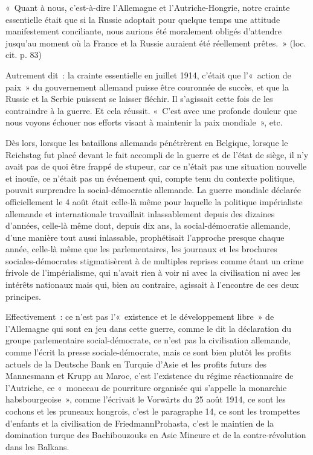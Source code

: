 \documentclass[french,twoside]{book} %
\newenvironment{quoteblock}%
  {\begin{quoting}}
  {\end{quoting}}
\newenvironment{quotebar}{%
    \def\FrameCommand{{\color{rubric!10!}\vrule width 0.5em} \hspace{0.9em}}%
    \def\OuterFrameSep{\itemsep} %
    \MakeFramed {\advance\hsize-\width \FrameRestore}
  }%
  {%
    \endMakeFramed
  }
\renewenvironment{quoteblock}%
  {%
    \savenotes
    \setstretch{0.9}
    \normalfont
    \begin{quotebar}
  }
  {%
    \end{quotebar}
    \spewnotes
  }
\begin{document}
\begin{quoteblock}
 \noindent « Quant à nous, c’est-à-dire l’Allemagne et l’Autriche-Hongrie, notre crainte essentielle était que si la Russie adoptait pour quelque temps une attitude manifestement conciliante, nous aurions été moralement obligés d’attendre jusqu’au moment où la France et la Russie auraient été réellement prêtes. » (loc. cit. p. 83)
\end{quoteblock}

\noindent Autrement dit : la crainte essentielle en juillet 1914, c’était que l’« action de paix » du gouvernement allemand puisse être couronnée de succès, et que la Russie et la Serbie puissent se laisser fléchir. Il s’agissait cette fois de les contraindre à la guerre. Et cela réussit. « C'est avec une profonde douleur que nous voyons échouer nos efforts visant à maintenir la paix mondiale », etc.\par
Dès lors, lorsque les bataillons allemands pénétrèrent en Belgique, lorsque le Reichstag fut placé devant le fait accompli de la guerre et de l’état de siège, il n’y avait pas de quoi être frappé de stupeur, car ce n’était pas une situation nouvelle et inouïe, ce n’était pas un événement qui, compte tenu du contexte politique, pouvait surprendre la social-démocratie allemande. La guerre mondiale déclarée officiellement le 4 août était celle-là même pour laquelle la politique impérialiste allemande et internationale travaillait inlassablement depuis des dizaines d’années, celle-là même dont, depuis dix ans, la social-démocratie allemande, d’une manière tout aussi inlassable, prophétisait l’approche presque chaque année, celle-là même que les parlementaires, les journaux et les brochures sociales-démocrates stigmatisèrent à de multiples reprises comme étant un crime frivole de l’impérialisme, qui n’avait rien à voir ni avec la civilisation ni avec les intérêts nationaux mais qui, bien au contraire, agissait à l’encontre de ces deux principes.\par
Effectivement : ce n’est pas l’« existence et le développement libre » de l’Allemagne qui sont en jeu dans cette guerre, comme le dit la déclaration du groupe parlementaire social-démocrate, ce n’est pas la civilisation allemande, comme l’écrit la presse sociale-démocrate, mais ce sont bien plutôt les profits actuels de la Deutsche Bank en Turquie d’Asie et les profits futurs des Mannesmann et Krupp au Maroc, c’est l’existence du régime réactionnaire de l’Autriche, ce « monceau de pourriture organisée qui s’appelle la monarchie habsbourgeoise », comme l’écrivait le Vorwärts du 25 août 1914, ce sont les cochons et les pruneaux hongrois, c’est le paragraphe 14, ce sont les trompettes d’enfants et la civilisation de FriedmannProhasta, c’est le maintien de la domination turque des Bachibouzouks en Asie Mineure et de la contre-révolution dans les Balkans.\par
\end{document}
